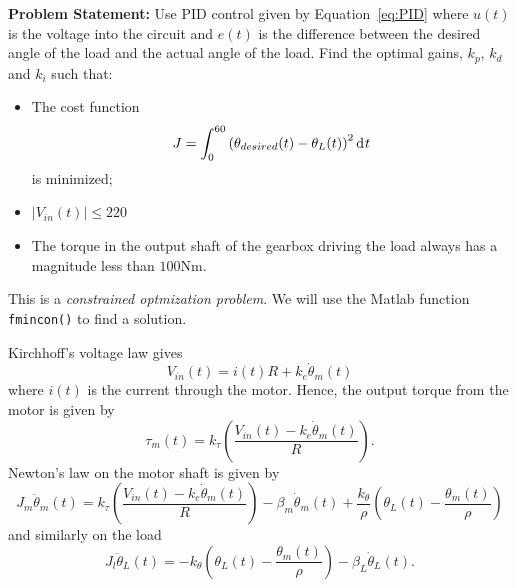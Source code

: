 \textbf{Problem Statement:} Use PID control given by Equation~\ref{eq:PID} where $u(t)$ is the voltage into the circuit and $e(t)$ is the difference between the desired angle of the load and the actual angle of the load. Find the optimal gains, $k_p$, $k_d$ and $k_i$ such that:
\begin{itemize}
  \item The cost function
    \begin{equation}
      J = \int_0^{60} \left( \theta_{desired}(t) - \theta_L(t) \right)^2 \operatorname{d}\hspace*{-1pt} t 
      \label{eq:optcf}
    \end{equation}
    is minimized;
  \item $\left| V_{in}(t) \right| \leq 220$ 
  \item The torque in the output shaft of the gearbox driving the load always has a magnitude less than $100$Nm.
\end{itemize}
This is a \emph{constrained optmization problem}. We will use the Matlab function \texttt{fmincon()} to find a solution.

Kirchhoff's voltage law gives
\begin{equation*}
  V_{in}(t) = i(t) R + k_e \dot \theta_m(t)
\end{equation*}
where $i(t)$ is the current through the motor. Hence, the output torque from the motor is given by
\begin{equation*}
  \tau_m(t) = k_\tau \left( \frac{V_{in}(t) - k_e \dot \theta_m(t)}{R} \right).
\end{equation*}
Newton's law on the motor shaft is given by
\begin{equation*}
  J_m \ddot \theta_m(t) = k_\tau \left( \frac{V_{in}(t) - k_e \dot \theta_m(t)}{R} \right) - \beta_m \dot \theta_m(t) + \frac{k_\theta}{\rho} \left( \theta_L(t) - \frac{\theta_m(t)}{\rho} \right)
\end{equation*}
and similarly on the load
\begin{equation*}
  J_l \ddot \theta_L(t) = -k_\theta \left( \theta_L(t) - \frac{\theta_m(t)}{\rho} \right) - \beta_L \dot \theta_L(t).
\end{equation*}

